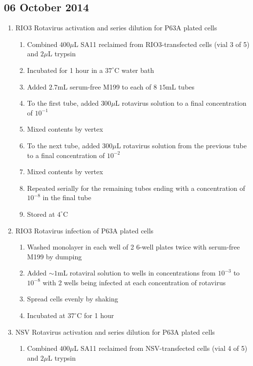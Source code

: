 
\subsection*{06 October 2014}

\begin{enumerate}
	\item RIO3 Rotavirus activation and series dilution for P63A plated cells
		\begin{enumerate}
			\item Combined $400\mu$L SA11 reclaimed from RIO3-transfected cells (vial 3 of 5) and $2\mu$L trypsin
			\item Incubated for 1 hour in a $37^{\circ}$C water bath
			\item Added $2.7$mL serum-free M199 to each of 8 $15$mL tubes
			\item To the first tube, added $300\mu$L rotavirus solution to a final concentration of $10^{-1}$
			\item Mixed contents by vertex
			\item To the next tube, added $300\mu$L rotavirus solution from the previous tube to a final concentration of $10^{-2}$
			\item Mixed contents by vertex
			\item Repeated serially for the remaining tubes ending with a concentration of $10^{-8}$ in the final tube
			\item Stored at $4^{\circ}$C
		\end{enumerate}
	\item RIO3 Rotavirus infection of P63A plated cells
		\begin{enumerate}
			\item Washed monolayer in each well of 2 6-well plates twice with serum-free M199 by dumping
			\item Added $\sim 1$mL rotaviral solution to wells in concentrations from $10^{-3}$ to $10^{-8}$ with 2 wells being infected at each concentration of rotavirus
			\item Spread cells evenly by shaking
			\item Incubated at $37^{\circ}$C for 1 hour
		\end{enumerate}
	\item NSV Rotavirus activation and series dilution for P63A plated cells
		\begin{enumerate}
			\item Combined $400\mu$L SA11 reclaimed from NSV-transfected cells (vial 4 of 5) and $2\mu$L trypsin

\end{enumerate}
\end{enumerate}
